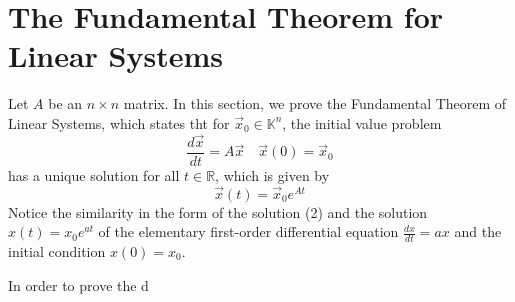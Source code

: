 \documentclass[11pt]{book}
\theoremstyle{definition}\newtheorem{definition}[subsection]{Definition}
\theoremstyle{definition}\newtheorem{example}[subsection]{Example}
\theoremstyle{definition}\newtheorem{notation}[subsection]{Notation}
\theoremstyle{definition}\newtheorem{remark}[subsection]{Remark}
\theoremstyle{theorem}\newtheorem{theorem}[subsection]{Theorem}
\theoremstyle{theorem}\newtheorem{lemma}[subsection]{Lemma}
\theoremstyle{theorem}\newtheorem{proposition}[subsection]{Proposition}
\theoremstyle{theorem}\newtheorem{corollary}[subsection]{Corollary}
\theoremstyle{theorem}\newtheorem{case}{Case}
\theoremstyle{remark}\newtheorem{subcase}{Subcase}[case]
\newcommand{\K}{\mathbb{K}}
\newcommand{\R}{\mathbb{R}}
\begin{document}
\section{The Fundamental Theorem for Linear Systems}

Let $A$ be an $n \times n$ matrix. In this section, we prove the Fundamental Theorem of Linear Systems, which states tht for $\vec{x}_0 \in \K^n$, the initial value problem
\begin{equation*}
    \frac{d\vec{x}}{dt} = A\vec{x} \quad \vec{x}(0) = \vec{x}_0 \tag{1}
\end{equation*}
has a unique solution for all $t \in \R$, which is given by
\begin{equation*}
    \vec{x}(t) = \vec{x}_0e^{At} \tag{2}
\end{equation*}
Notice the similarity in the form of the solution (2) and the solution $x(t) = x_0e^{at}$ of the elementary first-order differential equation $\frac{dx}{dt} = ax$ and the initial condition $x(0) = x_0$.

In order to prove the d

\printindex
\end{document}
